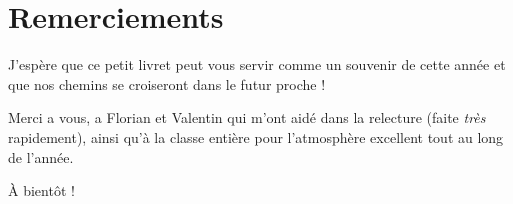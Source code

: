\documentclass{coursbook}
\begin{document}
	\chapter{Remerciements}
	J'espère que ce petit livret peut vous servir comme un souvenir de cette année et que nos chemins se croiseront dans le futur proche !
	
	Merci a vous, a Florian et Valentin qui m'ont aidé dans la relecture (faite \textit{très} rapidement), ainsi qu'à la classe entière pour l'atmosphère excellent tout au long de l'année.
	
	À bientôt !
\end{document}
